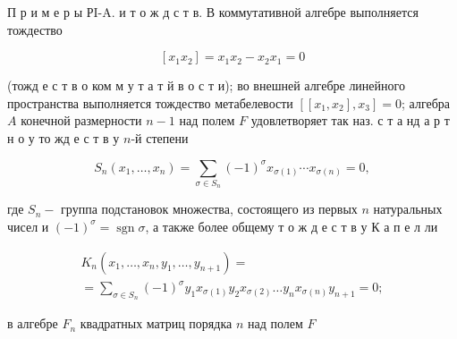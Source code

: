\documentclass[10pt]{article}
\begin{document}
П р и м е р ы РI-A. и т о ж д с т в. В коммутативной алгебре выполняется тождество



\[

\left[x_{1} x_{2}\right]=x_{1} x_{2}-x_{2} x_{1}=0

\]



(тожд е с т в о ком м у т а т й в о с т и); во внешней алгебре линейного пространства выполняется тождество метабелевости $\left[\left[x_{1}, x_{2}\right], x_{3}\right]=0$; алгебра $A$ конечной размерности $n-1$ над полем $F$ удовлетворяет так наз. с т а нд а р т н о у то жд е с т в у $n$-й степени



\[

S_{n}\left(x_{1}, \ldots, x_{n}\right)=\sum_{\sigma \in S_{n}}(-1)^{\sigma} x_{\sigma(1)} \cdots x_{\sigma(n)}=0,

\]



где $S_{n}-$ группа подстановок множества, состоящего из первых $n$ натуральных чисел и $(-1)^{\sigma}=\operatorname{sgn} \sigma$, а также более общему т о ж д е с т в у К а п е л ли



\[

\begin{gathered}

K_{n}\left(x_{1}, \ldots, x_{n}, y_{1}, \ldots, y_{n+1}\right)= \\

=\sum_{\sigma \in S_{n}}(-1)^{\sigma} y_{1} x_{\sigma(1)} y_{2} x_{\sigma(2)} \ldots y_{n} x_{\sigma(n)} y_{n+1}=0 ;

\end{gathered}

\]



в алгебре $F_{n}$ квадратных матриц порядка $n$ над полем $F$
\end{document}
